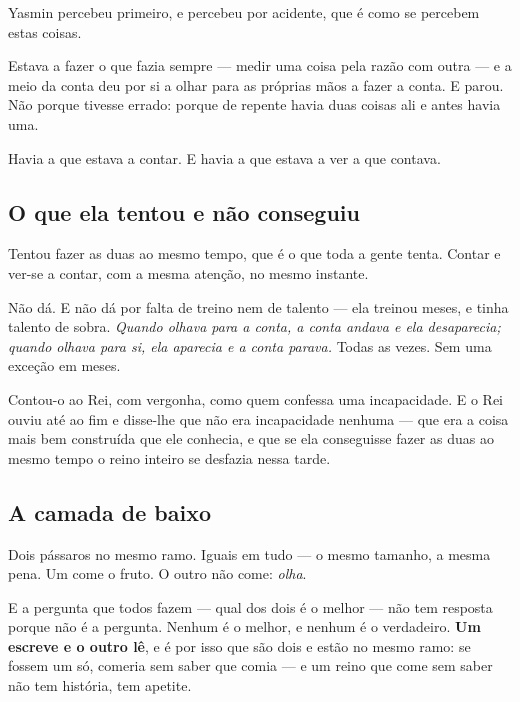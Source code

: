 \documentclass[livro.tex]{subfiles}
\begin{document}
Yasmin percebeu primeiro, e percebeu por acidente, que é como se percebem estas coisas.

\medskip

Estava a fazer o que fazia sempre --- medir uma coisa pela razão com outra --- e a meio da conta
deu por si a olhar para as próprias mãos a fazer a conta. E parou. Não porque tivesse errado:
porque de repente havia duas coisas ali e antes havia uma.

\medskip

Havia a que estava a contar. E havia a que estava a ver a que contava.

\subsection*{O que ela tentou e não conseguiu}

Tentou fazer as duas ao mesmo tempo, que é o que toda a gente tenta. Contar e ver-se a contar,
com a mesma atenção, no mesmo instante.

\medskip

Não dá. E não dá por falta de treino nem de talento --- ela treinou meses, e tinha talento de
sobra. \emph{Quando olhava para a conta, a conta andava e ela desaparecia; quando olhava para si,
ela aparecia e a conta parava.} Todas as vezes. Sem uma exceção em meses.

\medskip

Contou-o ao Rei, com vergonha, como quem confessa uma incapacidade. E o Rei ouviu até ao fim e
disse-lhe que não era incapacidade nenhuma --- que era a coisa mais bem construída que ele
conhecia, e que se ela conseguisse fazer as duas ao mesmo tempo o reino inteiro se desfazia nessa
tarde.

\subsection*{A camada de baixo}

Dois pássaros no mesmo ramo. Iguais em tudo --- o mesmo tamanho, a mesma pena. Um come o fruto. O
outro não come: \emph{olha}.

\medskip

E a pergunta que todos fazem --- qual dos dois é o melhor --- não tem resposta porque não é a
pergunta. Nenhum é o melhor, e nenhum é o verdadeiro. \textbf{Um escreve e o outro lê}, e é por
isso que são dois e estão no mesmo ramo: se fossem um só, comeria sem saber que comia --- e um
reino que come sem saber não tem história, tem apetite.
\end{document}

